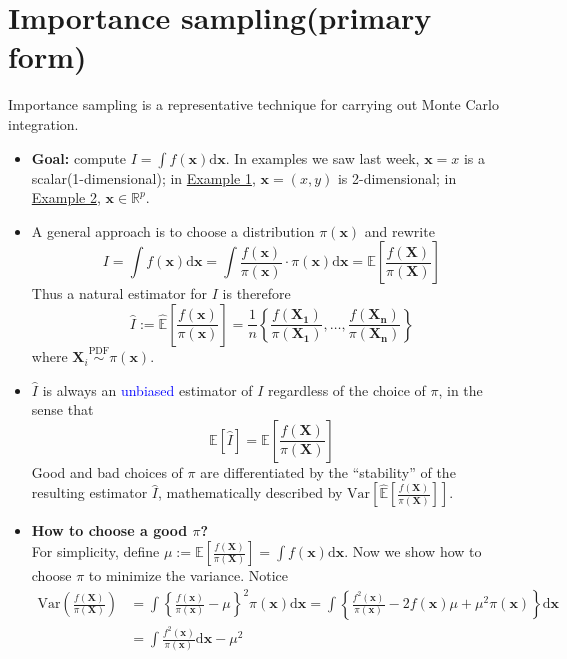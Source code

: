 \documentclass[12pt]{article}
\begin{document}
\section{Importance sampling(primary form)}
Importance sampling is a representative technique for carrying out Monte Carlo integration.
\begin{itemize}
	\item {\bf Goal:} compute $I=\int f(\bm{x})\textrm{d}\bm{x}$. In examples we saw last week, $\bm{x}=x$ is a scalar(1-dimensional); in \underline{Example 1}, $\bm{x}=(x, y)$ is 2-dimensional; in \underline{Example 2}, $\bm{x}\in\mathbb{R}^p$.
	\item A general approach is to choose a distribution $\pi(\bm{x})$ and rewrite
	$$
	I = \int f(\bm{x})\textrm{d}\bm{x} = \int \frac{f(\bm{x})}{\pi(\bm{x})} \cdot \pi(\bm{x})\textrm{d}\bm{x} = \mathbb{E}\left[ \frac{f(\bm{X})}{\pi(\bm{X})} \right]
	$$
	Thus a natural estimator for $I$ is therefore
	\begin{equation}
	\hat{I}:=\hat{\mathbb{E}}\left[ \frac{f(\bm{x})}{\pi(\bm{x})} \right] = \frac{1}{n}\left\{ \frac{f(\bm{X_1})}{\pi(\bm{X_1})}, \ldots, \frac{f(\bm{X_n})}{\pi(\bm{X_n})} \right\}   \label{Ihat}
	\end{equation}
	where $\bm{X}_i\stackrel{\textrm{PDF}}{\sim}\pi(\bm{x})$.
	\item $\hat{I}$ is always an \textcolor{blue}{unbiased} estimator of $I$ regardless of the choice of $\pi$, in the sense that
	$$
	\mathbb{E}[\hat{I}] = \mathbb{E}\left[ \frac{f(\bm{X})}{\pi(\bm{X})} \right]
	$$
	Good and bad choices of $\pi$ are differentiated by the ``stability'' of the resulting estimator $\hat{I}$, mathematically described by $\textrm{Var}\left[ \hat{\mathbb{E}}\left[ \frac{f(\bm{X})}{\pi(\bm{X})} \right] \right]$.
	\item {\bf How to choose a good $\pi$?}\\
	For simplicity, define $\mu:=\mathbb{E}\left[ \frac{f(\bm{X})}{\pi(\bm{X})} \right] = \int f(\bm{x})\textrm{d}\bm{x}$. Now we show how to choose $\pi$ to minimize the variance. Notice
	\begin{align*}
	\textrm{Var}\left( \frac{f(\bm{X})}{\pi(\bm{X})} \right) &= \int\left\{ \frac{f(\bm{x})}{\pi(\bm{x})} - \mu \right\}^2 \pi(\bm{x}) \textrm{d}\bm{x} = \int\left\{ \frac{f^2(\bm{x})}{\pi(\bm{x})} - 2f(\bm{x})\mu + \mu^2\pi(\bm{x}) \right\}\textrm{d}\bm{x}\\
	&=\int \frac{f^2(\bm{x})}{\pi(\bm{x})}\textrm{d}\bm{x}  - \mu^2
	\end{align*}

\end{itemize}
\end{document}
